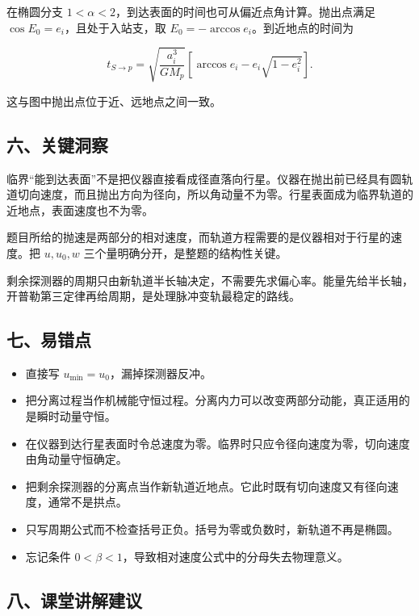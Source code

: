 \documentclass[12pt,a4paper,UTF8]{ctexart}
\newcommand{\tightlist}{\setlength{\itemsep}{0pt}\setlength{\parskip}{0pt}}
\begin{document}
在椭圆分支 \(1<\alpha<2\)，到达表面的时间也可从偏近点角计算。抛出点满足
\(\cos E_0=e_i\)，且处于入站支，取
\(E_0=-\arccos e_i\)。到近地点的时间为

\[t_{S\to p}=\sqrt{\frac{a_i^3}{GM_p}}
\left[\arccos e_i-e_i\sqrt{1-e_i^2}\right].\]

这与图中抛出点位于近、远地点之间一致。

\subsection{六、关键洞察}\label{ux516dux5173ux952eux6d1eux5bdf}

临界``能到达表面''不是把仪器直接看成径直落向行星。仪器在抛出前已经具有圆轨道切向速度，而且抛出方向为径向，所以角动量不为零。行星表面成为临界轨道的近地点，表面速度也不为零。

题目所给的抛速是两部分的相对速度，而轨道方程需要的是仪器相对于行星的速度。把
\(u,u_0,w\) 三个量明确分开，是整题的结构性关键。

剩余探测器的周期只由新轨道半长轴决定，不需要先求偏心率。能量先给半长轴，开普勒第三定律再给周期，是处理脉冲变轨最稳定的路线。

\subsection{七、易错点}\label{ux4e03ux6613ux9519ux70b9}

\begin{itemize}
\tightlist
\item
  直接写 \(u_{\min}=u_0\)，漏掉探测器反冲。
\item
  把分离过程当作机械能守恒过程。分离内力可以改变两部分动能，真正适用的是瞬时动量守恒。
\item
  在仪器到达行星表面时令总速度为零。临界时只应令径向速度为零，切向速度由角动量守恒确定。
\item
  把剩余探测器的分离点当作新轨道近地点。它此时既有切向速度又有径向速度，通常不是拱点。
\item
  只写周期公式而不检查括号正负。括号为零或负数时，新轨道不再是椭圆。
\item
  忘记条件 \(0<\beta<1\)，导致相对速度公式中的分母失去物理意义。
\end{itemize}

\subsection{八、课堂讲解建议}\label{ux516bux8bfeux5802ux8bb2ux89e3ux5efaux8bae}
\end{document}

